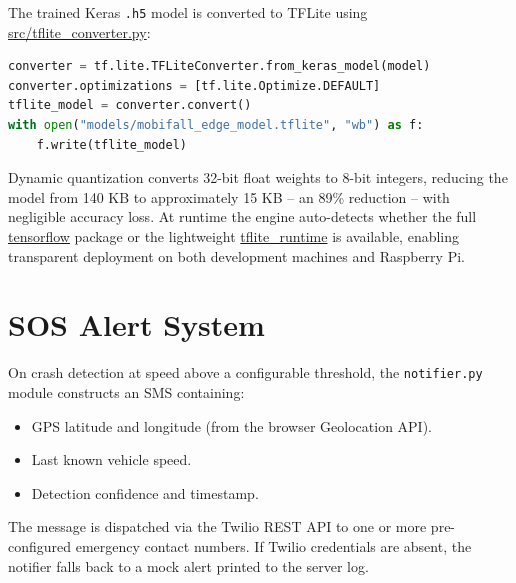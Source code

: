 The trained Keras \texttt{.h5} model is converted to TFLite using \url{src/tflite_converter.py}:

\begin{lstlisting}[language=Python, caption={TFLite conversion with dynamic range quantization.}]
converter = tf.lite.TFLiteConverter.from_keras_model(model)
converter.optimizations = [tf.lite.Optimize.DEFAULT]
tflite_model = converter.convert()
with open("models/mobifall_edge_model.tflite", "wb") as f:
    f.write(tflite_model)
\end{lstlisting}

Dynamic quantization converts 32-bit float weights to 8-bit integers, reducing the model from 140 KB to approximately 15 KB -- an 89\% reduction -- with negligible accuracy loss. At runtime the engine auto-detects whether the full \url{tensorflow} package or the lightweight \url{tflite_runtime} is available, enabling transparent deployment on both development machines and Raspberry Pi.

\section{SOS Alert System}
\label{sec:sos}

On crash detection at speed above a configurable threshold, the \texttt{notifier.py} module constructs an SMS containing:
\begin{itemize}
    \item GPS latitude and longitude (from the browser Geolocation API).
    \item Last known vehicle speed.
    \item Detection confidence and timestamp.
\end{itemize}
The message is dispatched via the Twilio REST API to one or more pre-configured emergency contact numbers. If Twilio credentials are absent, the notifier falls back to a mock alert printed to the server log.